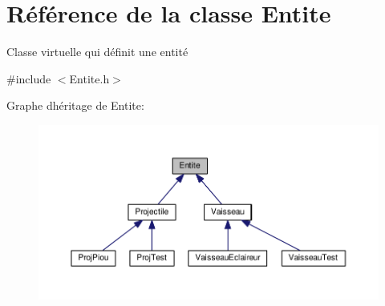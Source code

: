 \hypertarget{class_entite}{}\section{Référence de la classe Entite}
\label{class_entite}


Classe virtuelle qui définit une entité  




{\ttfamily \#include $<$Entite.\+h$>$}



Graphe d\textquotesingle{}héritage de Entite\+:\nopagebreak
\begin{figure}[H]
\begin{center}
\leavevmode
\includegraphics[width=350pt]{class_entite__inherit__graph}
\end{center}
\end{figure}

